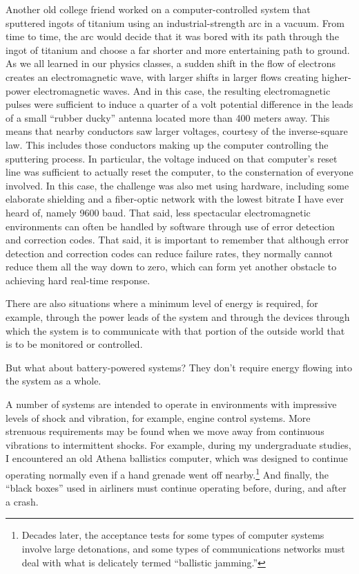 Another old college friend worked on a computer-controlled system
that sputtered ingots of titanium using an industrial-strength arc
in a vacuum.
From time to time, the arc would decide that it was bored with its path
through the ingot of titanium and choose a far shorter and more
entertaining path to ground.
As we all learned in our physics classes, a sudden shift in the flow of
electrons creates an electromagnetic wave, with larger shifts in larger
flows creating higher-power electromagnetic waves.
And in this case, the resulting electromagnetic pulses were sufficient
to induce a quarter of a volt potential difference in the leads of
a small ``rubber ducky'' antenna located more than 400 meters away.
This means that nearby conductors saw larger voltages, courtesy of the
inverse-square law.
This includes those
conductors making up the computer controlling the sputtering process.
In particular, the voltage induced on that computer's reset line was
sufficient to actually reset the computer, to the consternation of everyone
involved.
In this case, the challenge was also met using hardware, including some
elaborate shielding and a fiber-optic network with the lowest bitrate
I have ever heard of, namely 9600 baud.
That said, less spectacular electromagnetic environments can often be
handled by software through use of error detection and correction codes.
That said, it is important to remember that although error detection and
correction codes can reduce failure rates, they normally cannot reduce
them all the way down to zero, which can form yet another obstacle
to achieving hard real-time response.

There are also situations where a minimum level of energy
is required, for example, through the power leads of the system and
through the devices through which the system is to communicate with
that portion of the outside world that is to be monitored or controlled.

\QuickQuiz{}
	But what about battery-powered systems?
	They don't require energy flowing into the system as a whole.
 \QuickQuizEnd

A number of systems are intended to operate in environments with impressive
levels of shock and vibration, for example, engine control systems.
More strenuous requirements may be found when we move away from
continuous vibrations to intermittent shocks.
For example, during my undergraduate studies, I encountered an old Athena
ballistics computer, which was designed to continue operating normally even if
a hand grenade went off nearby.\footnote{
	Decades later, the acceptance tests for some types of computer
	systems involve large detonations, and some types of
	communications networks must deal with what is delicately
	termed ``ballistic jamming.''}
And finally, the ``black boxes'' used in airliners must continue operating
before, during, and after a crash.

